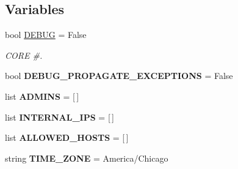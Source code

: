 \subsection*{Variables}
\begin{DoxyCompactItemize}
\item 
\mbox{\label{namespacedjango_1_1conf_1_1global__settings_a3a6019421d318eb5cb48fa06494ee09c}} 
bool \mbox{\hyperlink{namespacedjango_1_1conf_1_1global__settings_a3a6019421d318eb5cb48fa06494ee09c}{D\+E\+B\+UG}} = False
\begin{DoxyCompactList}\small\item\em C\+O\+RE \#. \end{DoxyCompactList}\item 
\mbox{\label{namespacedjango_1_1conf_1_1global__settings_a5b22468756f39cc864c4bb9a82b6f625}} 
bool {\bfseries D\+E\+B\+U\+G\+\_\+\+P\+R\+O\+P\+A\+G\+A\+T\+E\+\_\+\+E\+X\+C\+E\+P\+T\+I\+O\+NS} = False
\item 
\mbox{\label{namespacedjango_1_1conf_1_1global__settings_a53f9a4a9bb72d64115de4a39101fed10}} 
list {\bfseries A\+D\+M\+I\+NS} = \mbox{[}$\,$\mbox{]}
\item 
\mbox{\label{namespacedjango_1_1conf_1_1global__settings_a57f7775838b008531fd7e662f721cd7f}} 
list {\bfseries I\+N\+T\+E\+R\+N\+A\+L\+\_\+\+I\+PS} = \mbox{[}$\,$\mbox{]}
\item 
\mbox{\label{namespacedjango_1_1conf_1_1global__settings_acb60a588efb9087b465748d639a8cfdd}} 
list {\bfseries A\+L\+L\+O\+W\+E\+D\+\_\+\+H\+O\+S\+TS} = \mbox{[}$\,$\mbox{]}
\item 
\mbox{\label{namespacedjango_1_1conf_1_1global__settings_ac4c08d47b7a14c58f7c81dbc1caf7744}} 
string {\bfseries T\+I\+M\+E\+\_\+\+Z\+O\+NE} = \textquotesingle{}America/Chicago\textquotesingle{}
\item 
\mbox{\label{namespacedjango_1_1conf_1_1global__settings_a79c29765cee9ad2e5d55f0cda9b63c50}} 

\end{DoxyCompactItemize}
